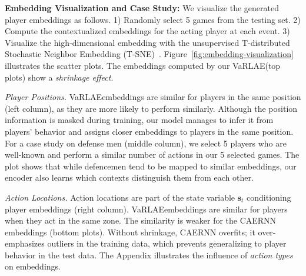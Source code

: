 \documentclass{article}
\newcommand{\latentvariables}{\mathbf{z}}
\newcommand{\state}{\mathbf{s}}
\newcommand{\system}{VaRLAE\;}
\begin{document}
{\bf Embedding Visualization and Case Study:}
We visualize the generated player embeddings as follows.  1) Randomly select 5 games from the testing set. 2) Compute the contextualized embeddings 
for the acting player at each event. 3) Visualize the high-dimensional embedding with the unsupervised T-distributed Stochastic Neighbor Embedding (T-SNE)~\cite{maaten2008visualizing}. 
Figure~\ref{fig:embedding-visualization} illustrates the scatter plots.  The embeddings computed by our \system (top plots) show a {\it shrinkage effect}. 

{\em Player Positions.} 
\system embeddings are similar for
players in the same position (left column), as they are more likely to perform similarly. Although the position information is masked during training, our model manages to infer it from players' behavior and assigns closer embeddings to players in the same position.
For a case study on  defense men (middle column), we select 5 players who are well-known and perform a similar number of actions in our  5 selected games.
The plot shows that while defencemen tend to be mapped to similar embeddings, our encoder also learns which contexts distinguish them from each other.

{\em Action Locations.} 
Action locations are part of the state variable $\state_{t}$ conditioning player embeddings (right column). 
\system embeddings are similar for players when they act in the same zone. 
The similarity is 
weaker for the CAERNN embeddings (bottom plots). Without %
shrinkage, CAERNN overfits;
it over-emphasizes %
outliers in the training data, which prevents generalizing to player behavior in the test data.   
The Appendix illustrates the influence of {\em action types} on embeddings. %
\end{document}
